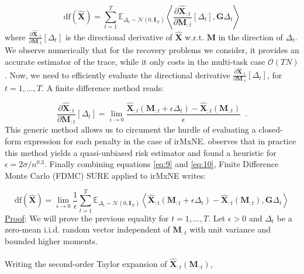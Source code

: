 \begin{equation} \label{eq:9}
    \text{df}(\widehat{\mathbf{X}}) = 
    \sum_{t=1}^T
    \mathbb{E}_{\Delta_t \sim \mathcal{N}(0, \mathbf{I}_N)}
    \left\langle
        \frac{
            \partial \widehat{\mathbf{X}}_{:t}
        }{
            \partial \mathbf{M}_{:t}
        }[\Delta_t],
        \mathbf{G}\Delta_t
    \right\rangle
\end{equation}
%
where $\frac{\partial \widehat{\mathbf{X}}_{:t}}{\partial \mathbf{M}_{:t}}[\Delta_t]$ is the directional derivative of $\widehat{\mathbf{X}}$ w.r.t.
$\mathbf{M}$ in the direction of $\Delta_t$.
We observe numerically that for the recovery problems we consider, it provides an accurate estimator of the trace, while it only
costs in the multi-task case $\mathcal{O}(TN)$. Now, we need to efficiently evaluate the directional derivative 
$\frac{\partial \widehat{\mathbf{X}}_{:t}}{\partial \mathbf{M}_{:t}}[\Delta_t]$, for $t=1,\dots, T$. A finite difference method reads:

\begin{equation} \label{eq:10}
    \frac{\partial \widehat{\mathbf{X}}_{:t}}{\partial \mathbf{M}_{:t}} 
    [\Delta_t]
    = \lim_{\epsilon \rightarrow 0}
    \frac{
        \widehat{\mathbf{X}}_{:t}(\mathbf{M}_{:t} + \epsilon \Delta_t)
        -
        \widehat{\mathbf{X}}_{:t}(\mathbf{M}_{:t})
    }{\epsilon}
    \enspace .
\end{equation}
%
This generic method allows us to circument the hurdle of evaluating a closed-form expression for each penalty
in the case of irMxNE. \cite{Deledalle_Vaiter_Fadili_Peyre14} observes that in practice this method yields a 
quasi-unbiased risk estimator and found a heuristic for $\epsilon = 2\sigma / n^{0.3}$. Finally combining equations
\eqref{eq:9} and \eqref{eq:10}, Finite Difference Monte Carlo (FDMC) SURE applied to irMxNE writes:

\begin{equation} \label{eq:11}
    \text{df}(\widehat{\mathbf{X}}) = 
    \lim_{\epsilon \rightarrow 0}
    \frac{1}{\epsilon}
    \sum_{t=1}^T
    \mathbb{E}_{\Delta_t \sim \mathcal{N}(0, \mathbf{I}_N)}
    \left\langle
        \widehat{\mathbf{X}}_{:t}(\mathbf{M}_{:t} + \epsilon \Delta_t)
        -
        \widehat{\mathbf{X}}_{:t}(\mathbf{M}_{:t})
        ,
        \mathbf{G}\Delta_t
    \right\rangle
\end{equation}
%
\underline{Proof}: We will prove the previous equality for $t=1, \dots, T$. Let
$\epsilon > 0$ and $\Delta_t$ be a zero-mean i.i.d. random vector independent of
$\mathbf{M}_{:t}$ with unit variance and bounded higher moments.
\\
\\
Writing the second-order Taylor expansion of $\widehat{\mathbf{X}}_{:t}(\mathbf{M}_{:t})$,

